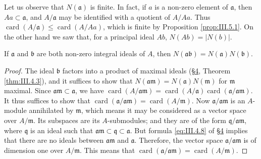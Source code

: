 Let us observe that $N(\mathfrak{a})$ is finite. In fact, if $a$ is a
non-zero element of $\mathfrak{a}$, then $Aa\subset\mathfrak{a}$, and
$A/\mathfrak{a}$ may be identified with a quotient of $A/Aa$. Thus
$\operatorname{card}(A/\mathfrak{a})\leq\operatorname{card}(A/Aa)$, which is
finite by Proposition \ref{prop:III.5.1}. On the other hand we saw that, for
a principal ideal $Ab$, $N(Ab)=|N(b)|$.

\begin{proposition}
\label{prop:III.5.2}
If $\mathfrak{a}$ and $\mathfrak{b}$ are both non-zero integral ideals of
$A$, then $N(\mathfrak{a}\mathfrak{b})
=N(\mathfrak{a})N(\mathfrak{b})$.
\end{proposition}

\begin{proof}
The ideal $\mathfrak{b}$ factors into a product of maximal ideals (\hyperref[sec:3.4]{§4},
Theorem \ref{thm:III.4.3}), and it suffices to show that
$N(\mathfrak{a}\mathfrak{m})=N(\mathfrak{a})N(\mathfrak{m})$ for
$\mathfrak{m}$ maximal. Since
$\mathfrak{a}\mathfrak{m}\subset\mathfrak{a}$, we have
$\operatorname{card}(A/\mathfrak{a}\mathfrak{m})
=\operatorname{card}(A/\mathfrak{a})
\operatorname{card}(\mathfrak{a}/\mathfrak{a}\mathfrak{m})$. It thus suffices
to show that
$\operatorname{card}(\mathfrak{a}/\mathfrak{a}\mathfrak{m})
=\operatorname{card}(A/\mathfrak{m})$. Now
$\mathfrak{a}/\mathfrak{a}\mathfrak{m}$ is an $A$-module annihilated by
$\mathfrak{m}$, which means it may be considered as a vector space over
$A/\mathfrak{m}$. Its subspaces are its $A$-submodules; and they are of the
form $\mathfrak{q}/\mathfrak{a}\mathfrak{m}$, where $\mathfrak{q}$ is an
ideal such that
$\mathfrak{a}\mathfrak{m}\subset\mathfrak{q}\subset\mathfrak{a}$. But
formula \eqref{eq:III.4.8} of \hyperref[sec:3.4]{§4} implies that there are no ideals between
$\mathfrak{a}\mathfrak{m}$ and $\mathfrak{a}$. Therefore, the vector space
$\mathfrak{a}/\mathfrak{a}\mathfrak{m}$ is of dimension one over
$A/\mathfrak{m}$. This means that
$\operatorname{card}(\mathfrak{a}/\mathfrak{a}\mathfrak{m})
=\operatorname{card}(A/\mathfrak{m})$.
\end{proof}
